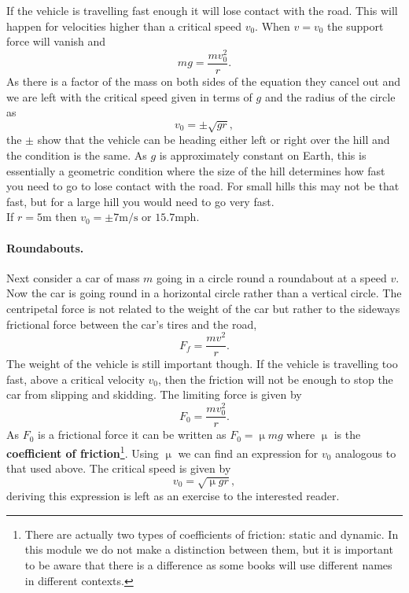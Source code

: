 If the vehicle is travelling fast enough it will lose contact with the road. This will happen for velocities higher than a critical speed $v_{0}$. When $v=v_{0}$ the support force will vanish and
\begin{equation*}
mg=\frac{mv^{2}_{0}}{r}.
\end{equation*}
As there is a factor of the mass on both sides of the equation they cancel out and we are left with the critical speed given in terms of $g$ and the radius of the circle as
\begin{equation*}
v_{0}=\pm\sqrt{gr},
\end{equation*}
the $\pm$ show that the vehicle can be heading either left or right over the hill and the condition is the same. As $g$ is approximately constant on Earth, this is essentially a geometric condition where the size of the hill determines how fast you need to go to lose contact with the road. For small hills this may not be that fast, but for a large hill you would need to go very fast.\\

If $r=5\text{m}$ then $v_{0}=\pm 7\text{m/s}$ or $15.7\text{mph}$.

\paragraph{Roundabouts.} Next consider a car of mass $m$ going in a circle round a roundabout at a speed $v$. Now the car is going round in a horizontal circle rather than a vertical circle. The centripetal force is not related to the weight of the car but rather to the sideways frictional force between the car's tires and the road,
\begin{equation*}
F_{f}=\frac{mv^{2}}{r}.
\end{equation*}
The weight of the vehicle is still important though. If the vehicle is travelling too fast, above a critical velocity $v_{0}$, then the friction will not be enough to stop the car from slipping and skidding. The limiting force is given by
\begin{equation*}
F_{0}=\frac{mv_{0}^{2}}{r}.
\end{equation*}
As $F_{0}$ is a frictional force it can be written as $F_{0}=\upmu mg$ where $\upmu$ is the \textbf{coefficient of friction}\footnote{There are actually two types of coefficients of friction: static and dynamic. In this module we do not make a distinction between them, but it is important to be aware that there is a difference as some books will use different names in different contexts.}.  Using $\upmu$ we can find an expression for $v_{0}$ analogous to that used above. The critical speed is given by
\begin{equation*}
v_{0}=\sqrt{\upmu g r},
\end{equation*}
deriving this expression is left as an exercise to the interested reader.

